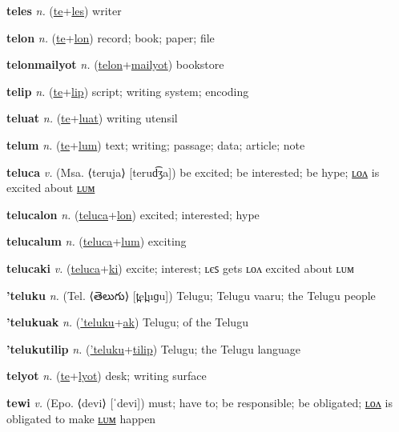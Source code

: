 \textbf{\hypertarget{teles}{teles}} \textit{n.} (\hyperlink{te}{te}+\allowbreak \hyperlink{les}{les})
writer

\textbf{\hypertarget{telon}{telon}} \textit{n.} (\hyperlink{te}{te}+\allowbreak \hyperlink{lon}{lon})
record; book; paper; file

\textbf{\hypertarget{telonmailyot}{telonmailyot}} \textit{n.} (\hyperlink{telon}{telon}+\allowbreak \hyperlink{mailyot}{mailyot})
bookstore

\textbf{\hypertarget{telip}{telip}} \textit{n.} (\hyperlink{te}{te}+\allowbreak \hyperlink{lip}{lip})
script; writing system; encoding

\textbf{\hypertarget{teluat}{teluat}} \textit{n.} (\hyperlink{te}{te}+\allowbreak \hyperlink{luat}{luat})
writing utensil

\textbf{\hypertarget{telum}{telum}} \textit{n.} (\hyperlink{te}{te}+\allowbreak \hyperlink{lum}{lum})
text; writing; passage; data; article; note

\textbf{\hypertarget{teluca}{teluca}} \textit{v.} (Msa. ⟨teruja⟩ [terud͡ʒa])
be excited; be interested; be hype; \hyperlink{telucalon}{ʟᴏᴧ} is excited about \hyperlink{telucalum}{ʟᴜᴍ}

\textbf{\hypertarget{telucalon}{telucalon}} \textit{n.} (\hyperlink{teluca}{teluca}+\allowbreak \hyperlink{lon}{lon})
excited; interested; hype

\textbf{\hypertarget{telucalum}{telucalum}} \textit{n.} (\hyperlink{teluca}{teluca}+\allowbreak \hyperlink{lum}{lum})
exciting

\textbf{\hypertarget{telucaki}{telucaki}} \textit{v.} (\hyperlink{teluca}{teluca}+\allowbreak \hyperlink{ki}{ki})
excite; interest; ʟєꜱ gets ʟᴏᴧ excited about ʟᴜᴍ

\textbf{\hypertarget{'teluku}{'teluku}} \textit{n.} (Tel. ⟨{\telugu{}తెలుగు}⟩ [t̪el̪uɡu])
Telugu; Telugu vaaru; the Telugu people

\textbf{\hypertarget{'telukuak}{'telukuak}} \textit{n.} (\hyperlink{'teluku}{'teluku}+\allowbreak \hyperlink{ak}{ak})
Telugu; of the Telugu

\textbf{\hypertarget{'telukutilip}{'telukutilip}} \textit{n.} (\hyperlink{'teluku}{'teluku}+\allowbreak \hyperlink{tilip}{tilip})
Telugu; the Telugu language

\textbf{\hypertarget{telyot}{telyot}} \textit{n.} (\hyperlink{te}{te}+\allowbreak \hyperlink{lyot}{lyot})
desk; writing surface

\textbf{\hypertarget{tewi}{tewi}} \textit{v.} (Epo. ⟨devi⟩ [ˈdevi])
must; have to; be responsible; be obligated; \hyperlink{tewilon}{ʟᴏᴧ} is obligated to make \hyperlink{tewilum}{ʟᴜᴍ} happen

